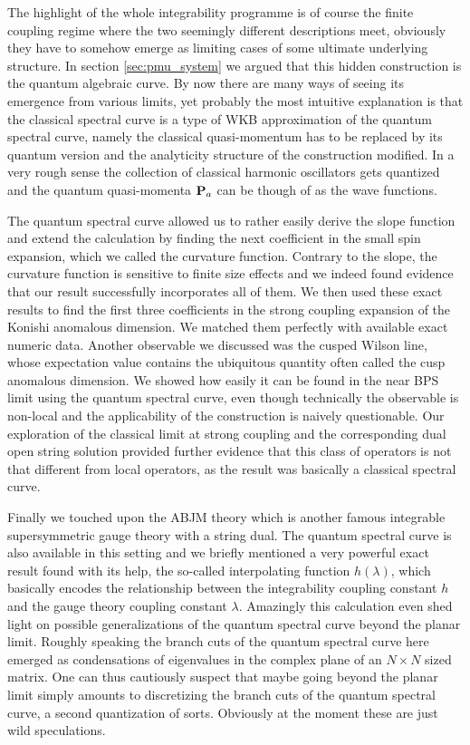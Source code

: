 The highlight of the whole integrability programme is of course the finite coupling regime where the two seemingly different descriptions meet, obviously they have to somehow emerge as limiting cases of some ultimate underlying structure.
In section \ref{sec:pmu_system} we argued that this hidden construction is the quantum algebraic curve. 
By now there are many ways of seeing its emergence from various limits, yet probably the most intuitive explanation is that the classical spectral curve is a type of WKB approximation of the quantum spectral curve, namely the classical quasi-momentum has to be replaced by its quantum version and the analyticity structure of the construction modified.
In a very rough sense the collection of classical harmonic oscillators gets quantized and the quantum quasi-momenta ${\bf P}_a$ can be though of as the wave functions. 

The quantum spectral curve allowed us to rather easily derive the slope function and extend the calculation by finding the next coefficient in the small spin expansion, which we called the curvature function.
Contrary to the slope, the curvature function is sensitive to finite size effects and we indeed found evidence that our result successfully incorporates all of them.
We then used these exact results to find the first three coefficients in the strong coupling expansion of the Konishi anomalous dimension.
We matched them perfectly with available exact numeric data.
Another observable we discussed was the cusped Wilson line, whose expectation value contains the ubiquitous quantity often called the cusp anomalous dimension.
We showed how easily it can be found in the near BPS limit using the quantum spectral curve, even though technically the observable is non-local and the applicability of the construction is naively questionable.
Our exploration of the classical limit at strong coupling and the corresponding dual open string solution provided further evidence that this class of operators is not that different from local operators, as the result was basically a classical spectral curve.

Finally we touched upon the ABJM theory which is another famous integrable supersymmetric gauge theory with a string dual.
The quantum spectral curve is also available in this setting and we briefly mentioned a very powerful exact result found with its help, the so-called interpolating function $h(\lambda)$, which basically encodes the relationship between the integrability coupling constant $h$ and the gauge theory coupling constant $\lambda$.
Amazingly this calculation even shed light on possible generalizations of the quantum spectral curve beyond the planar limit.
Roughly speaking the branch cuts of the quantum spectral curve here emerged as condensations of eigenvalues in the complex plane of an $N \times N$ sized matrix.
One can thus cautiously suspect that maybe going beyond the planar limit simply amounts to discretizing the branch cuts of the quantum spectral curve, a second quantization of sorts. 
Obviously at the moment these are just wild speculations.

